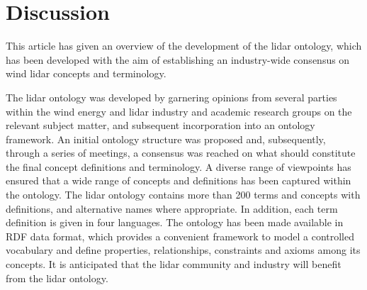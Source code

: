 \documentclass[remotesensing,article,submit,pdftex,moreauthors]{Definitions/mdpi}
\begin{document}




\section{Discussion}
\label{sec:Discussion}
This article has given an overview of the development of the lidar ontology, which has been developed with the aim of establishing an industry-wide consensus on wind lidar concepts and terminology.

The lidar ontology was developed by garnering opinions from several parties within the wind energy and lidar industry and academic research groups on the relevant subject matter, and subsequent incorporation into an ontology framework. 
An initial ontology structure was proposed and, subsequently, through a series of meetings, a consensus was reached on what should constitute the final concept definitions and terminology.
A diverse range of viewpoints has ensured that a wide range of concepts and definitions has been captured within the ontology. 
The lidar ontology contains more than 200 terms and concepts with definitions, and alternative names where appropriate. In addition, each term definition is given in four languages. 
The ontology has been made available in RDF data format, which provides a convenient framework to model a controlled vocabulary and define properties, relationships, constraints and axioms among its concepts.
It is anticipated that the lidar community and industry will benefit from the lidar ontology.
\end{document}
